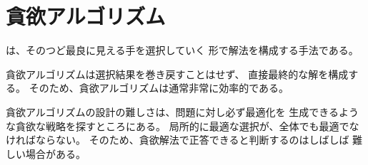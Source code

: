 \begin{comment}
\chapter{Greedy algorithms}

\index{greedy algorithm}

A \key{greedy algorithm}
constructs a solution to the problem
by always making a choice that looks
the best at the moment.
A greedy algorithm never takes back
its choices, but directly constructs
the final solution.
For this reason, greedy algorithms
are usually very efficient.

The difficulty in designing greedy algorithms
is to find a greedy strategy
that always produces an optimal solution
to the problem.
The locally optimal choices in a greedy
algorithm should also be globally optimal.
It is often difficult to argue that
a greedy algorithm works.
\end{comment}


\chapter{貪欲アルゴリズム}


は、そのつど最良に見える手を選択していく
形で解法を構成する手法である。

貪欲アルゴリズムは選択結果を巻き戻すことはせず、
直接最終的な解を構成する。
そのため、貪欲アルゴリズムは通常非常に効率的である。

貪欲アルゴリズムの設計の難しさは、問題に対し必ず最適化を
生成できるような貪欲な戦略を探すところにある。
局所的に最適な選択が、全体でも最適でなければならない。
そのため、貪欲解法で正答できると判断するのはしばしば
難しい場合がある。

\begin{comment}
\section{Coin problem}

As a first example, we consider a problem
where we are given a set of coins
and our task is to form a sum of money $x$
using the coins.
The values of the coins are
$\texttt{coins}=\{c_1,c_2,\ldots,c_k\}$,
and each coin can be used as many times we want.
What is the minimum number of coins needed?

For example, if the coins are the euro coins (in cents)
\[\{1,2,5,10,20,50,100,200\}\]
and $x=520$,
we need at least four coins.
The optimal solution is to select coins
$200+200+100+20$ whose sum is 520.
\end{comment}

